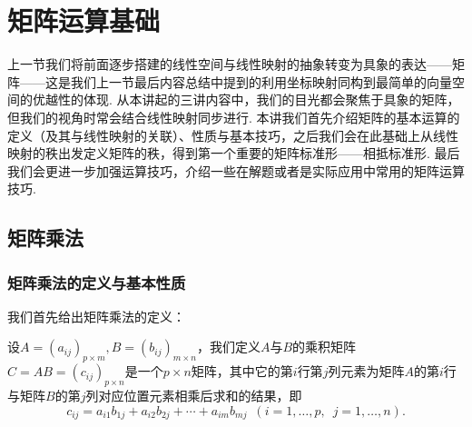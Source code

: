 \chapter{矩阵运算基础}

上一节我们将前面逐步搭建的线性空间与线性映射的抽象转变为具象的表达——矩阵——这是我们上一节最后内容总结中提到的利用坐标映射同构到最简单的向量空间的优越性的体现. 从本讲起的三讲内容中，我们的目光都会聚焦于具象的矩阵，但我们的视角时常会结合线性映射同步进行. 本讲我们首先介绍矩阵的基本运算的定义（及其与线性映射的关联）、性质与基本技巧，之后我们会在此基础上从线性映射的秩出发定义矩阵的秩，得到第一个重要的矩阵标准形——相抵标准形. 最后我们会更进一步加强运算技巧，介绍一些在解题或者是实际应用中常用的矩阵运算技巧.

\section{矩阵乘法}

\subsection{矩阵乘法的定义与基本性质}

我们首先给出矩阵乘法的定义：
\begin{definition}{}{}
    设$A=(a_{ij})_{p\times m},B=(b_{ij})_{m\times n}$，我们定义$A$与$B$的乘积矩阵$C=AB=(c_{ij})_{p\times n}$是一个$p\times n$矩阵，其中它的第$i$行第$j$列元素为矩阵$A$的第$i$行与矩阵$B$的第$j$列对应位置元素相乘后求和的结果，即
    \[c_{ij}=a_{i1}b_{1j}+a_{i2}b_{2j}+\cdots+a_{im}b_{mj}\enspace(i=1,\ldots,p,\enspace j=1,\ldots,n).\]
\end{definition}

